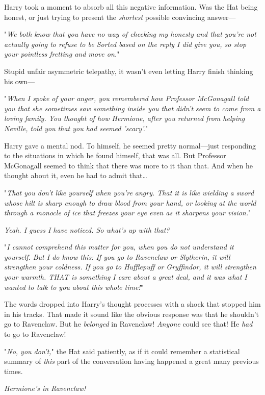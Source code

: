 Harry took a moment to absorb all this negative information. Was the Hat being 
honest, or just trying to present the \emph{shortest} possible convincing 
answer---

"\emph{We both know that you have no way of checking my honesty and that you're 
not actually going to refuse to be Sorted based on the reply I did give you, so 
stop your pointless fretting and move on.}"

Stupid unfair asymmetric telepathy, it wasn't even letting Harry finish 
thinking his own---

"\emph{When I spoke of your anger, you remembered how Professor McGonagall told 
you that she sometimes saw something inside you that didn't seem to come from a 
loving family. You thought of how Hermione, after you returned from helping 
Neville, told you that you had seemed 'scary'.}"

Harry gave a mental nod. To himself, he seemed pretty normal---just responding 
to the situations in which he found himself, that was all. But Professor 
McGonagall seemed to think that there was more to it than that. And when he 
thought about it, even he had to admit that{\ldots}

"\emph{That you don't like yourself when you're angry. That it is like wielding 
a sword whose hilt is sharp enough to draw blood from your hand, or looking at 
the world through a monocle of ice that freezes your eye even as it sharpens 
your vision.}"

\emph{Yeah. I guess I have noticed. So what's up with that?}

"\emph{I cannot comprehend this matter for you, when you do not understand it 
yourself. But I do know this: If you go to Ravenclaw or Slytherin, it will 
strengthen your coldness. If you go to Hufflepuff or Gryffindor, it will 
strengthen your warmth. THAT is something I care about a great deal, and it was 
what I wanted to talk to you about this whole time!}"

The words dropped into Harry's thought processes with a shock that stopped him 
in his tracks. That made it sound like the obvious response was that he 
shouldn't go to Ravenclaw. But he \emph{belonged} in Ravenclaw! \emph{Anyone} 
could see that! He \emph{had} to go to Ravenclaw!

"\emph{No, you don't,}" the Hat said patiently, as if it could remember a 
statistical summary of \emph{this} part of the conversation having happened a 
great many previous times.

\emph{Hermione's in Ravenclaw!}

